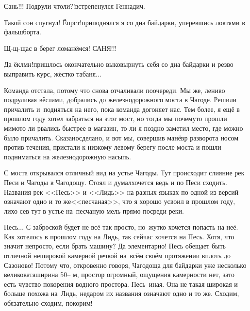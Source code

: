 \diagdash Сань!!! Подрули чтоли?!\mdash встрепенулся Геннадич.

\diagdash Такой сон спугнул! Ёпрст!\mdash приподнялся я со дна байдарки, уперевшись локтями в фальшборта.

\diagdash Щ-щ-щас в берег ломанёмся! САНЯ!!!

\diagdash Да ёклмн!\mdash пришлось окончательно выковырнуть себя со дна байдарки и резво выправить курс, жёстко табаня$\ldots$

Команда отстала, потому что снова отчаливали по\sdash очереди. Мы же, лениво подруливая вёслами, добрались до железнодорожного моста в Чагоде. Решили причалить и~подняться на него, пока команда догоняет нас. Тем более, я ещё в прошлом году хотел забраться на этот мост, но тогда мы почему\sdash то прошли мимо\mdash то ли рвались быстрее в магазин, то ли я поздно заметил место, где можно было причалить. Сказано\mdash сделано, и вот мы, совершив манёвр разворота носом против течения, пристали к низкому левому берегу после моста и пошли подниматься на железнодорожную насыпь.

С моста открывался отличный вид на устье Чагоды. Тут происходит слияние рек Песи и Чагоды в Чагодощу. Стоял и думал\mdash хочется ведь и по Песи сходить. Названия рек <<Песь>> и <<Лидь>> на разных языках по одной из версий означают одно и то же\mdash <<песчаная>>\cite{ЧагодаАльманахКузнецов}, что я хорошо усвоил в прошлом году, лихо сев тут в устье на~песчаную мель прямо посреди реки. 

Песь$\ldots$ С заброской будет не всё так просто, но~жутко хочется попасть на неё. Как хотелось в прошлом году на Лидь, так сейчас хочется на Песь. Хотя, что значит непросто, если брать машину? Да элементарно! 
Песь обещает быть отличной неширокой камерной речкой на~всём своём протяжении вплоть до Сазоново! Потому что, откровенно говоря, Чагодоща для байдарки уже несколько великовата\mdash ширина 50\thinspace\nobreakdash-- м, простор огромный, ощущения камерности нет, зато есть чувство покорения водного простора. Песь~иная. Она не такая широкая и больше похожа на~Лидь, недаром их названия означают одно и то же. Сходим, обязательно сходим, покорим!

